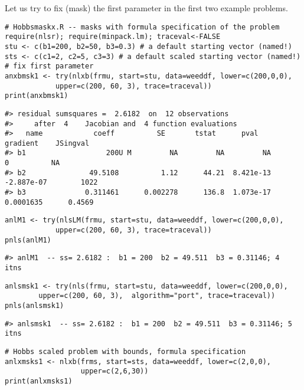 Let us try to fix (mask) the first parameter in the first two example problems.

\begin{verbatim}
# Hobbsmaskx.R -- masks with formula specification of the problem
require(nlsr); require(minpack.lm); traceval<-FALSE
stu <- c(b1=200, b2=50, b3=0.3) # a default starting vector (named!)
sts <- c(c1=2, c2=5, c3=3) # a default scaled starting vector (named!)
# fix first parameter
anxbmsk1 <- try(nlxb(frmu, start=stu, data=weeddf, lower=c(200,0,0), 
            upper=c(200, 60, 3), trace=traceval))
print(anxbmsk1)
\end{verbatim}

\begin{verbatim}
#> residual sumsquares =  2.6182  on  12 observations
#>     after  4    Jacobian and  4 function evaluations
#>   name            coeff          SE       tstat      pval      gradient    JSingval   
#> b1                   200U M         NA         NA         NA           0          NA  
#> b2               49.5108          1.12      44.21  8.421e-13  -2.887e-07        1022  
#> b3              0.311461      0.002278      136.8  1.073e-17   0.0001635      0.4569
\end{verbatim}

\begin{verbatim}
anlM1 <- try(nlsLM(frmu, start=stu, data=weeddf, lower=c(200,0,0), 
            upper=c(200, 60, 3), trace=traceval))
pnls(anlM1)
\end{verbatim}

\begin{verbatim}
#> anlM1  -- ss= 2.6182 :  b1 = 200  b2 = 49.511  b3 = 0.31146; 4  itns
\end{verbatim}

\begin{verbatim}
anlsmsk1 <- try(nls(frmu, start=stu, data=weeddf, lower=c(200,0,0), 
        upper=c(200, 60, 3),  algorithm="port", trace=traceval))
pnls(anlsmsk1)
\end{verbatim}

\begin{verbatim}
#> anlsmsk1  -- ss= 2.6182 :  b1 = 200  b2 = 49.511  b3 = 0.31146; 5  itns
\end{verbatim}

\begin{verbatim}
# Hobbs scaled problem with bounds, formula specification
anlxmsks1 <- nlxb(frms, start=sts, data=weeddf, lower=c(2,0,0),
                  upper=c(2,6,30))
print(anlxmsks1)
\end{verbatim}

